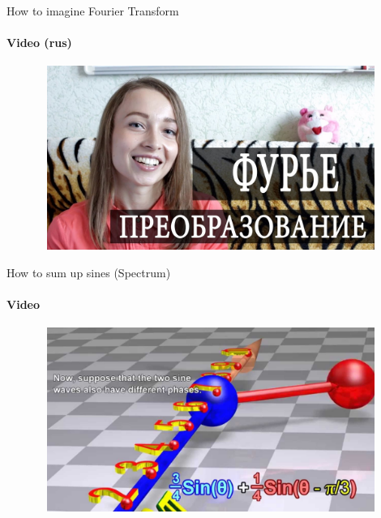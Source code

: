 \documentclass[aspectratio=169]{beamer}
\begin{document}
\begin{frame}[t]{How to imagine Fourier Transform}
    \framesubtitle{Video (rus)}
    \vspace{-0.6cm}
    \begin{figure}[H]
        \href{https://youtu.be/Vaa1BVGhpxI}{
            \centering\includegraphics[height=6cm,width=1\textwidth,keepaspectratio]{wdwnfourier_rus.jpg}}
        \label{fig:file_name}
    \end{figure}
\end{frame}

\begin{frame}[t]{How to sum up sines (Spectrum)}
    \framesubtitle{Video}
    \vspace{-0.6cm}
    \begin{figure}[H]
        \href{https://youtu.be/r18Gi8lSkfM}{
            \centering\includegraphics[height=6cm,width=1\textwidth,keepaspectratio]{Intro_to_fourier.jpg}}
        \label{fig:Intro_to_fourier.jpg}
    \end{figure}
\end{frame}
\end{document}
